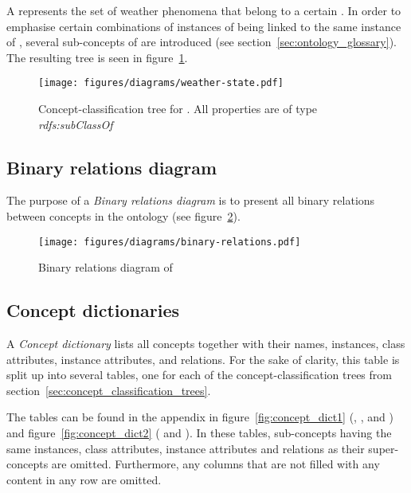 A  represents the set of weather phenomena that belong to a certain . In order to emphasise certain combinations of instances of  being linked to the same instance of , several sub-concepts of  are introduced (see section~\ref{sec:ontology_glossary}). The resulting tree is seen in figure~\ref{fig:tree_weather_state}.

\begin{figure}
  \centering
  \texttt{[image: figures/diagrams/weather-state.pdf]}
  \caption{Concept-classification tree for . All properties are of type \emph{rdfs:subClassOf}}
  \label{fig:tree_weather_state}
\end{figure}

\subsection{Binary relations diagram}
\label{subsec:binary_relations_diagram}

The purpose of a \emph{Binary relations diagram} is to present all binary relations between concepts in the ontology (see figure~\ref{fig:binary_relations}).

\begin{figure}
  \centering
  \texttt{[image: figures/diagrams/binary-relations.pdf]}
  \caption{Binary relations diagram of \smarthomeweather}
  \label{fig:binary_relations}
\end{figure}

\subsection{Concept dictionaries}
\label{subsec:concept_dictionaries}

A \emph{Concept dictionary} lists all concepts together with their names, instances, class attributes, instance attributes, and relations. For the sake of clarity, this table is split up into several tables, one for each of the concept-classification trees from section~\ref{sec:concept_classification_trees}.

The tables can be found in the appendix in figure~\ref{fig:concept_dict1} (, , and ) and figure~\ref{fig:concept_dict2} ( and ). In these tables, sub-concepts having the same instances, class attributes, instance attributes and relations as their super-concepts are omitted. Furthermore, any columns that are not filled with any content in any row are omitted.

